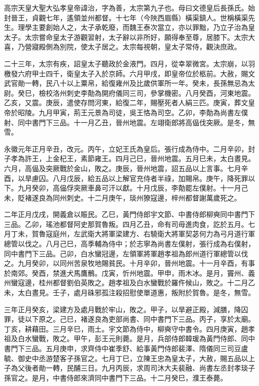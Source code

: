 
\begin{pinyinscope}

 高宗天皇大聖大弘孝皇帝諱治，字為善，太宗第九子也。母曰文德皇后長孫氏。始封晉王，貞觀七年，遙領並州都督。十七年（今陜西眉縣）橫渠鎮人。世稱橫渠先生。理學主要創始人之，太子承乾廢，而魏王泰次當立，亦以罪黜，乃立子治為皇太子。太宗嘗命皇太子游觀習射，太子辭以非所好，願得奉至尊，居膝下。太宗大喜，乃營寢殿側為別院，使太子居之。太宗每視朝，皇太子常侍，觀決庶政。



 二十三年，太宗有疾，詔皇太子聽政於金液門。四月，從幸翠微宮。太宗崩，以羽檄發六府甲士四千，衛皇太子入於京師。六月甲戌，即皇帝位於柩前。大赦，賜文武官勛一轉，民八十以上粟帛，給復雍州及比歲供軍所一年。癸未，長孫無忌為太尉。癸巳，檢校洛州刺史李勣為開府儀同三司，參掌機密。八月癸酉，河東地震。乙亥，又震。庚辰，遣使存問河東，給復二年，賜壓死者人絹三匹。庚寅，葬文皇帝於昭陵。九月甲寅，荊王元景為司徒，吳王恪為司空。乙卯，李勣為尚書左僕射、同中書門下三品。十一月乙丑，晉州地震。左翊衛郎將高偘伐突厥。是冬，無雪。



 永徽元年正月辛丑，改元。丙午，立妃王氏為皇后。張行成為侍中。二月辛卯，封子孝為許王，上金杞王，素節雍王。四月己巳，晉州地震。五月巳未，太白晝見。六月，高偘及突厥戰於金山，敗之。庚辰，晉州地震，詔五品以上言事。七月辛酉，以旱慮囚。八月戊辰，給五品以上解官充侍者半祿，加賜帛。庚午，降死罪以下。九月癸卯，高偘俘突厥車鼻可汗以獻。十月戊辰，李勣罷左僕射。十一月己未，貶褚遂良為同州刺史。十二月庚午，琰州獠寇邊，梓州都督謝萬歲死之。



 二年正月戊戌，開義倉以賑民。乙巳，黃門侍郎宇文節、中書侍郎柳奭同中書門下三品。乙卯，瑤池都督阿史那賀魯叛。四月乙丑，命有司毋進肉食，訖於五月。七月丁未，賀魯寇庭州，左武衛大將軍梁建方、右驍衛大將軍契苾何力為弓月道行軍總管以伐之。八月己巳，高季輔為侍中；於志寧為尚書左僕射，張行成為右僕射，同中書門下三品。己卯，白水蠻冠邊，左領軍將軍趙孝祖為郎州道行軍總管以伐之。九月癸卯，以同州苦泉牧地賜貧民。十月辛卯，晉州地震。十一月辛酉，有事於南郊。癸酉，禁進犬馬鷹鶻。戊寅，忻州地震。甲申，雨木冰。是月，竇州、義州蠻寇邊，桂州都督劉伯英敗之。趙孝祖及白水蠻戰於羅仵候山，敗之。十二月乙未，太白晝見。壬子，處月硃邪孤注殺招慰使單道惠，叛附於賀魯。是冬，無雪。



 三年正月癸亥，梁建方及處月戰於牢山，敗之。甲子，以旱避正殿，減膳，降囚罪，徒以下原之。己巳，褚遂良為吏部尚書、同中書門下三品。丙子，享於太廟。丁亥，耕藉田。三月辛巳，雨土。宇文節為侍中，柳奭守中書令。四月庚寅，趙孝祖及白水蠻戰，敗之。甲午，彭王元則薨。是月，兵部侍郎韓瑗為黃門侍郎、同中書門下三品。五月庚申，求齊侍中崔季舒、給事黃門侍郎裴澤、隋儀同三司豆盧毓、御史中丞游楚客子孫官之。七月丁巳，立陳王忠為皇太子，大赦，賜五品以上子為父後者勛一轉，民酺三日。九月丙辰，求周司沐大夫裴融、尚書左丞封孝琰子孫官之。是月，中書侍郎來濟同中書門下三品。十二月癸巳，濮王泰薨。




\end{pinyinscope}
